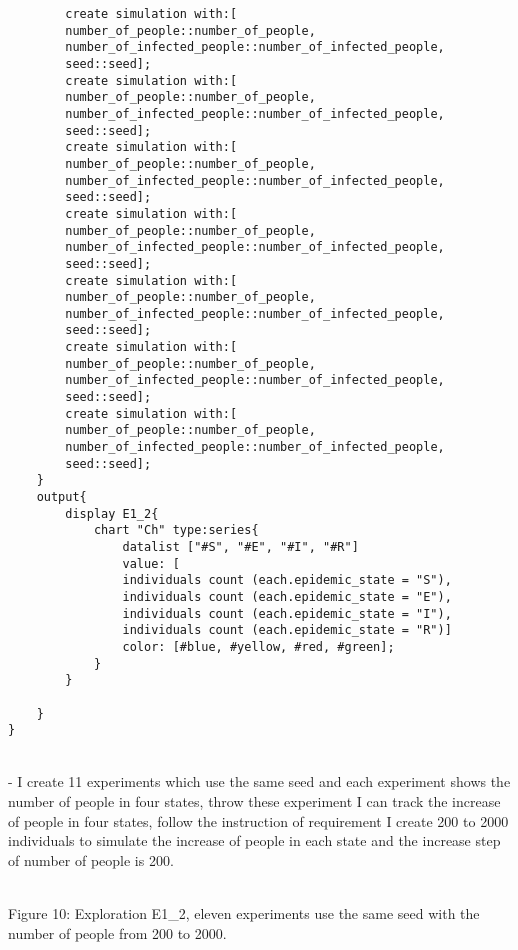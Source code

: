 \documentclass{article}
\begin{document}
\begin{tcolorbox}
\begin{lstlisting}
		create simulation with:[
		number_of_people::number_of_people,
		number_of_infected_people::number_of_infected_people,
		seed::seed];
		create simulation with:[
		number_of_people::number_of_people,
		number_of_infected_people::number_of_infected_people,
		seed::seed];
		create simulation with:[
		number_of_people::number_of_people,
		number_of_infected_people::number_of_infected_people,
		seed::seed];
		create simulation with:[
		number_of_people::number_of_people,
		number_of_infected_people::number_of_infected_people,
		seed::seed];
		create simulation with:[
		number_of_people::number_of_people,
		number_of_infected_people::number_of_infected_people,
		seed::seed];
		create simulation with:[
		number_of_people::number_of_people,
		number_of_infected_people::number_of_infected_people,
		seed::seed];
		create simulation with:[
		number_of_people::number_of_people,
		number_of_infected_people::number_of_infected_people,
		seed::seed];
	}
	output{
		display E1_2{
			chart "Ch" type:series{
				datalist ["#S", "#E", "#I", "#R"] 
				value: [
				individuals count (each.epidemic_state = "S"), 					
				individuals count (each.epidemic_state = "E"),  					
				individuals count (each.epidemic_state = "I"), 				
				individuals count (each.epidemic_state = "R")] 		  					
				color: [#blue, #yellow, #red, #green];
			}
		}
		
	}
}
\end{lstlisting}
\end{tcolorbox}
\newpage
\\- I create 11 experiments which use the same seed and each experiment shows the number of people in four states, throw these experiment I can track the increase of people in four states, follow the instruction of requirement I create 200 to 2000 individuals to simulate the increase of people in each state and the increase step of number of people is 200.

\begin{pic10}
\\
\caption{Figure 10: Exploration E1\_2, eleven experiments use the same seed with the number of people from 200 to 2000.}
\end{pic10}

\newpage
\end{document}
